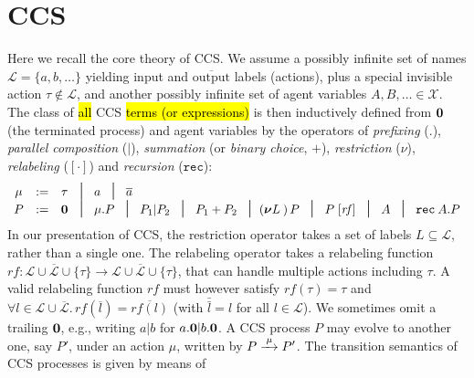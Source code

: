
\section{CCS}
\label{ss:ccs}

Here we recall the core theory of CCS.
We assume a possibly infinite set of names $\mathscr{L} = \{a, b,
\ldots\}$ yielding input and $\overline{\mbox{output}}$ labels (actions), plus a special invisible
action $\tau \notin \mathscr{L}$, and another possibly infinite
set of agent variables $A, B, \ldots \in \mathscr{X}$.
The class of \hl{all} CCS \hl{terms (or expressions)} is then inductively
defined from ${\boldsymbol 0}$ (the terminated process) and agent variables by the operators
of \emph{prefixing} (.), \emph{parallel composition} ($|$),
\emph{summation}
(or \emph{binary choice}, $+$),
\emph{restriction} ($\nu$), \emph{relabeling} ($[\cdot]$) and
\emph{recursion} ($\texttt{rec}$):
\begin{equation*}
\begin{array}{cccl}
\mu  & := & \tau\!\!\!\! & \midd \; a  \; \midd \;  \outC a  \\
P  & := & \nil\!\!\!\! & \midd \;  \mu . P \; \midd \;  P_1 |  P_2 \; \midd  \;
P_1 + P_2 \; \midd 
(\res L)\, P
\; \midd \; P\; [\mathit{rf}]  %
\;  \midd \;  A \; \midd \; \recu A  P
\end{array}
\end{equation*}
In our presentation of CCS, the restriction operator takes a set of labels $L
  \subseteq \mathscr{L}$, rather than a single one.  
The relabeling operator takes a relabeling function
  $\mathit{rf} \colon \mathscr{L} \cup \overline{\mathscr{L}} \cup
    \{\tau\} \rightarrow \mathscr{L} \cup \overline{\mathscr{L}} \cup
    \{\tau\}$, that can  handle multiple actions including $\tau$. A valid
    relabeling function $\mathit{rf}$ must however 
satisfy $\mathit{rf}(\tau) =
    \tau$ and $\forall l\in\mathscr{L} \cup \overline{\mathscr{L}}.\, \mathit{rf}(\overline{l}) =
    \overline{\mathit{rf}(l)}$ (with $\bar{\bar l} = l$ for all $l \in
    \mathscr{L}$).
We sometimes omit a trailing ${\boldsymbol 0}$, e.g., writing $a|b$ for $a.{\boldsymbol 0} |b .{\boldsymbol 0}$.
A CCS process $P$ may evolve to another one, say $P'$, under
  an action $\mu$, written by $P \arr{\mu} P'$.
The transition semantics of CCS processes is given by means of
